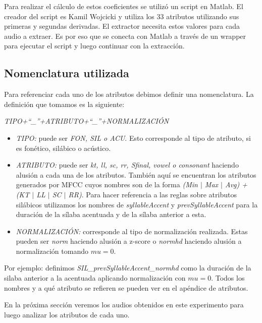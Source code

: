 Para realizar el cálculo de estos coeficientes se utilizó un script en Matlab. El creador del script es Kamil Wojcicki y utiliza los 33 atributos utilizando sus primeras y segundas derivadas. El extractor necesita estos valores para cada audio a extraer. Es por eso que se conecta con Matlab a través de un wrapper para ejecutar el script y luego continuar con la extracción.

\subsection{Nomenclatura utilizada}
Para referenciar cada uno de los atributos debimos definir una nomenclatura. La definición que tomamos es la siguiente:
\begin{center}
\textit{TIPO+``\_''+ATRIBUTO+``\_''+NORMALIZACIÓN} 
\end{center}

\begin{itemize}
  \item \emph{TIPO:} puede ser \emph{FON, SIL o ACU}. Esto corresponde al tipo de atributo, si es fonético, silábico o acústico.
  \item \emph{ATRIBUTO:} puede ser \emph{kt, ll, sc, rr, Sfinal, vowel o consonant} haciendo alusión a cada una de los atributos. También aquí se encuentran los atributos generados por MFCC cuyos nombres son de la forma \emph{(Min $|$ Max $|$ Avg) + (KT $|$ LL $|$ SC $|$ RR)}. Para hacer referencia a las reglas sobre atributos silábicos utilizamos los nombres de \emph{syllableAccent} y \emph{prevSyllableAccent} para la duración de la sílaba acentuada y de la sílaba anterior a esta.
  \item \emph{NORMALIZACIÓN:} corresponde al tipo de normalización realizada. Estas pueden ser \emph{norm} haciendo alusión a z-score o \emph{normhd} haciendo alusión a normalización tomando $mu=0$.
\end{itemize}
 
Por ejemplo: definimos \textit{SIL\_prevSyllableAccent\_normhd} como la duración de la silaba anterior a la acentuada aplicando normalización con $mu=0$. Todos los nombres y a qué atributo se refieren se pueden ver en el apéndice de atributos.

En la próxima sección veremos los audios obtenidos en este experimento para luego analizar los atributos de cada uno.
